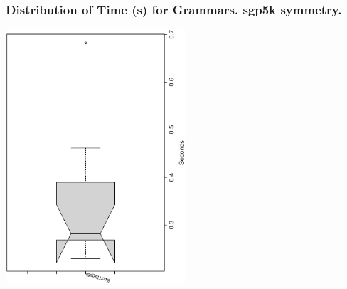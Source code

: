  \begin{frame}
 \frametitle{ Distribution of Time (s) for Grammars. sgp5k  symmetry. }
 \begin{center}
\includegraphics[width=0.5\textwidth, angle=-90]
{ExpFboxplottSeconds003.eps}
 \end{center}
 \label{ExpFboxplottSeconds003.eps}  
 \end{frame}

